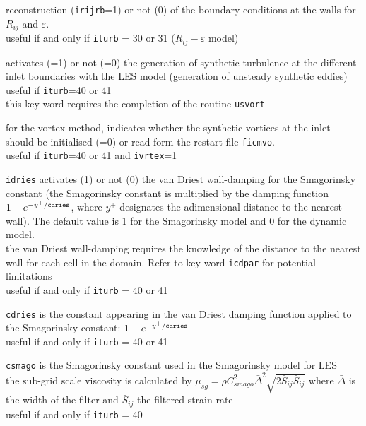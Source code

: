 {reconstruction ({\tt irijrb}=1)
or not (0) of the boundary conditions at the walls for $R_{ij}$ and  $\varepsilon$.\\
useful if and only if {\tt iturb} = 30 or 31 ($R_{ij}-\varepsilon$ model)}



{activates (=1) or not (=0) the generation of synthetic turbulence at the
different inlet boundaries with the LES model (generation of unsteady synthetic
eddies)\\
useful if {\tt iturb}=40 or 41\\
this key word requires the completion of the routine
\texttt{usvort}}

{for the vortex method, indicates whether the synthetic vortices at the inlet
should be initialised (=0) or read form the restart file {\tt ficmvo}.\\
useful if {\tt iturb}=40 or 41 and {\tt ivrtex}=1}


{{\tt idries} activates (1) or not (0) the van
Driest wall-damping for the Smagorinsky constant (the Smagorinsky
constant is multiplied by the damping function
$1-e^{-y^+/{\tt cdries}}$, where $y^+$ designates the adimensional
distance to the nearest wall). The default value is 1 for the
Smagorinsky model and 0 for the dynamic model.\\
the van Driest wall-damping requires the knowledge of the distance to the
nearest wall for each cell in the domain. Refer to key word {\tt icdpar}
for potential limitations\\
useful if and only if {\tt iturb} = 40 or 41}

{{\tt cdries} is the constant appearing in the
van Driest damping function applied to the Smagorinsky constant:
 $1-e^{-y^+/{\tt cdries}}$\\
useful if and only if {\tt iturb} = 40 or 41}

{{\tt csmago} is the Smagorinsky constant used in
the Smagorinsky model for LES\\
the sub-grid scale viscosity is calculated by
 $\displaystyle\mu_{sg}=\rho C_{smago}^2\bar{\Delta}^2\sqrt{2\bar{S}_{ij}\bar{S}_{ij}}$
where $\bar{\Delta}$ is the width of the filter and $\bar{S}_{ij}$ the filtered
strain rate\\
useful if and only if {\tt iturb} = 40}

